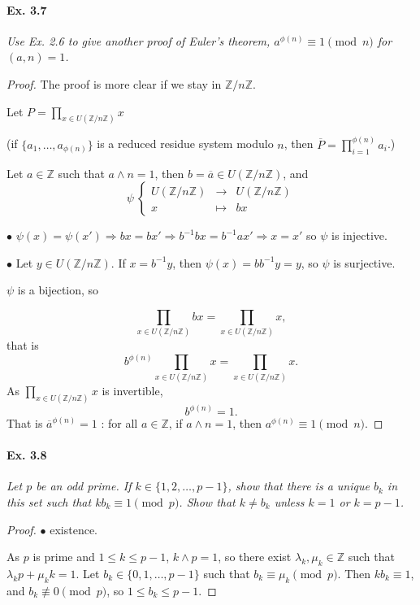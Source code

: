\documentclass[11pt,a4paper]{article}
\newcommand{\Z}{\mathbb{Z}}
\begin{document}
{\paragraph{Ex. 3.7}

{\it Use Ex. 2.6 to give another proof of Euler's theorem, $a^{\phi(n)} \equiv 1 \pmod n$ for $(a, n) = 1$.
}

\begin{proof}
The proof is more clear if we stay in $\Z/n\Z$.

Let $P = \prod\limits_{x \in U(\Z/n\Z)} x$

(if $\{a_1,\ldots,a_{\phi(n)}\}$ is a reduced residue system modulo $n$, then $\overline{P} = \prod\limits_{i=1}^{\phi(n)} a_{i}$.)

Let $a \in \Z$ such that $a \wedge n = 1$, then $b = \overline{a} \in U(\Z/n\Z)$, and
$$
\psi \ 
\left\{
\begin{array}{ccc}
 U(\Z/n\Z) &  \to  &   U(\Z/n\Z)  \\
  x &\mapsto   &bx   
\end{array}
\right.
$$

$\bullet$ $\psi(x) = \psi(x') \Rightarrow bx = bx' \Rightarrow b^{-1} b x = b^{-1} a x' \Rightarrow x = x'$ so $\psi$ is injective.

$\bullet$ Let $y \in U(\Z/n\Z)$. If $x = b^{-1}y$, then $\psi(x) = b b^{-1} y = y$, so $\psi$ is surjective.

$\psi$ is a bijection, so

$$\prod_{x \in U(\Z/n\Z) } bx = \prod_{x \in U(\Z/n\Z) } x,$$
that is
$$b^{\phi(n)} \prod_{x \in U(\Z/n\Z) } x = \prod_{x \in U(\Z/n\Z) } x.$$
As $\prod\limits_{x \in U(\Z/n\Z) } x$ is invertible, 
$$b^{\phi(n)} = 1.$$
That is $\overline{a}^{\phi(n)} = 1$ : for all $a\in \Z$, if $a\wedge n = 1$, then $a^{\phi(n)} \equiv 1 \pmod n$. 
\end{proof}

\paragraph{Ex. 3.8}

{\it Let $p$ be an odd prime. If $k \in \{1, 2, \ldots, p - 1\}$, show that there is a unique $b_k$ in this set such that $kb_k \equiv 1 \pmod p$. Show that $k \ne b_k$ unless $k = 1$ or $k = p - 1$.
}

\begin{proof}
$\bullet$ existence. 

As $p$ is prime and $1\leq k \leq p-1$, $k \wedge p= 1$, so there exist $\lambda_k,\mu_k\in \Z $ such that $\lambda_k p + \mu_k k = 1$.
Let $b_k \in \{0,1,\ldots,p-1\}$ such that $b_k \equiv \mu_k \pmod p$. Then  $k b_k \equiv 1$, and $b_k \not \equiv 0 \pmod p$, so $1\leq b_k \leq p-1$.


\end{proof}}
\end{document}

